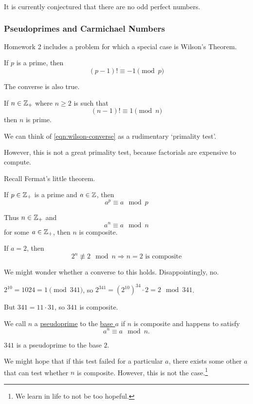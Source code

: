 It is currently conjectured that there are no odd perfect numbers.

\subsubsection{Pseudoprimes and Carmichael Numbers}
Homework 2 includes a problem for which a special case is Wilson's Theorem.
\begin{theorem}
	If $p$ is a prime, then
	\[(p-1)! \equiv -1\pmod{p}\]
\end{theorem}
The converse is also true.
\begin{proposition}
	If $n\in\mathbb Z_+$ where $n \geq 2$ is such that
	\begin{equation}
		(n-1)!\equiv 1\pmod{n} \tag{$*$} \label{eqn:wilson-converse}
	\end{equation}
	then $n$ is prime.
\end{proposition}
We can think of \cref{eqn:wilson-converse} as a rudimentary `primality test'.

However, this is not a great primality test, because factorials are expensive to compute.

Recall Fermat's little theorem.
\begin{theorem}
	If $p\in \mathbb Z_+$ is a prime and $a\in \mathbb Z$, then
	\[a^p\equiv a\mod{p}\]
\end{theorem}
Thus $n\in\mathbb Z_+$ and
\[a^n\equiv a\mod n\]
for some $a\in \mathbb Z_+$, then $n$ is composite.
\begin{example}
	If $a = 2$, then
	\[2^n\not\equiv 2\mod n\Rightarrow n=2 \text{ is composite}\]
\end{example}
\begin{ques*}
	We might wonder whether a converse to this holds. Disappointingly, no.
\end{ques*}

\begin{example}
	$2^{10} = 1024 = 1\pmod{341}$, so $2^{341} = (2^{10})^34\cdot 2 = 2\mod 341$.

	But $341 = 11\cdot 31$, so $341$ is composite.
\end{example}
\begin{definition}[Pseudoprime]
	We call $n$ a \ul{pseudoprime} to the \ul{base $a$} if $n$ is composite and happens to satisfy
	\[a^n\equiv a\mod n.\]
\end{definition}
\begin{example}
	$341$ is a pseudoprime to the base $2$.
\end{example}
We might hope that if this test failed for a particular $a$, there exists some other $a$ that can test whether $n$ is composite. However, this is not the case.\footnote{We learn in life to not be too hopeful.}

